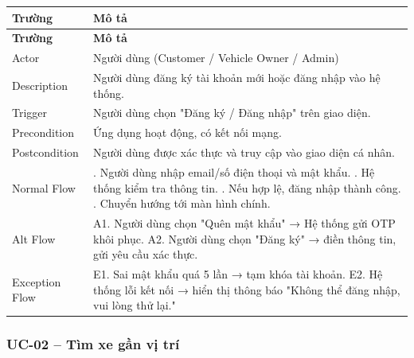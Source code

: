 \begin{longtable}{|>{\raggedright\arraybackslash}p{4cm}|>{\raggedright\arraybackslash}p{11cm}|}
\hline
\textbf{Trường} & \textbf{Mô tả} \\
\hline
\endfirsthead

\hline
\textbf{Trường} & \textbf{Mô tả} \\
\hline
\endhead

\hline
\endfoot

Actor & Người dùng (Customer / Vehicle Owner / Admin) \\
\hline
Description & Người dùng đăng ký tài khoản mới hoặc đăng nhập vào hệ thống. \\
\hline
Trigger & Người dùng chọn "Đăng ký / Đăng nhập" trên giao diện. \\
\hline
Precondition & Ứng dụng hoạt động, có kết nối mạng. \\
\hline
Postcondition & Người dùng được xác thực và truy cập vào giao diện cá nhân. \\
\hline
Normal Flow & 1. Người dùng nhập email/số điện thoại và mật khẩu. \newline 2. Hệ thống kiểm tra thông tin. \newline 3. Nếu hợp lệ, đăng nhập thành công. \newline 4. Chuyển hướng tới màn hình chính. \\
\hline
Alt Flow & A1. Người dùng chọn "Quên mật khẩu" → Hệ thống gửi OTP khôi phục. \newline A2. Người dùng chọn "Đăng ký" → điền thông tin, gửi yêu cầu xác thực. \\
\hline
Exception Flow & E1. Sai mật khẩu quá 5 lần → tạm khóa tài khoản. \newline E2. Hệ thống lỗi kết nối → hiển thị thông báo "Không thể đăng nhập, vui lòng thử lại." \\
\hline
\end{longtable}

\subsubsection*{UC-02 – Tìm xe gần vị trí}

